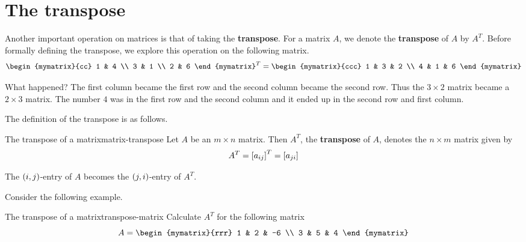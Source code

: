 \section{The transpose}

Another important operation on matrices is that of taking the
\textbf{transpose}. For a matrix $A$, we denote the \textbf{transpose}
of $A$ by $A^T$. Before formally defining the transpose, we explore
this operation on the following matrix.
\begin{equation*}
  \begin{mymatrix}{cc}
    1 & 4 \\
    3 & 1 \\
    2 & 6
  \end{mymatrix} ^{T}=\allowbreak \begin{mymatrix}{ccc}
    1 & 3 & 2 \\
    4 & 1 & 6
  \end{mymatrix}
\end{equation*}

What happened? The first column became the first row and the second
column became the second row. Thus the $3\times 2$ matrix became a
$2\times 3$ matrix. The number $4$ was in the first row and the second
column and it ended up in the second row and first column.

The definition of the transpose is as follows.

\begin{definition}{The transpose of a matrix}{matrix-transpose}
  Let $A$ be an $m\times n$ matrix. Then $A^{T}$, the
  \textbf{transpose} of $A$,
  denotes the $n\times m$ matrix given by
  \begin{equation*}
    A^{T} = \left[a _{ij}\right] ^{T}= \left[a_{ji} \right]
  \end{equation*}
\end{definition}

The $\left(i, j \right)$-entry of $A$ becomes the $\left(j,i \right)$-entry of
$A^T$.

Consider the following example.

\begin{example}{The transpose of a matrix}{transpose-matrix}
  Calculate $A^T$ for the following matrix
  \begin{equation*}
    A = \begin{mymatrix}{rrr}
      1 & 2 & -6 \\
      3 & 5 & 4
    \end{mymatrix}
  \end{equation*}
\end{example}


